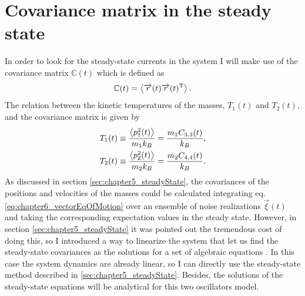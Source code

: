\section{Covariance matrix in the steady state\label{sec:covMatrix}}
%
%
%
%
%
%
In order to look for the steady-state currents in the system I will make use of the covariance matrix $\mathbb{C}(t)$ which is defined as
%
\begin{equation}
\mathbb{C}(t) = \expval{\overrightarrow{r}(t)\overrightarrow{r}(t)^\mathsf{T}}.
\end{equation}
%
The relation between the kinetic temperatures of the masses, $T_1(t)$ and  $T_2(t)$, and the covariance matrix is given by
%
\begin{align}
  T_1(t) &\equiv \frac{\expval{ p_1^2(t)}}{m_1 k_B} = \frac{m_1 C_{3,3}(t)}{k_B},
  \nonumber\\
   T_2(t) &\equiv \frac{\expval{ p_2^2(t)}}{m_2 k_B} = \frac{m_2 C_{4,4}(t)}{k_B}.
  \label{eq:chapter6_Temperature_definition}
\end{align}
%
As discussed in section \ref{sec:chapter5_steadyState}, the covariances of the positions and velocities of the masses could be calculated integrating eq. \eqref{eq:chapter6_vectorEqOfMotion} over an ensemble of noise realizations $\overrightarrow{\xi}(t)$ and taking the corresponding expectation values in the steady state. However, in section \ref{sec:chapter5_steadyState} it was pointed out the tremendous cost of doing this, so I introduced a way to linearize the system that let us find the steady-state covariances as the solutions for a set of algebraic equations \cite{Sarkka2019,Rieder1967,Casher1971}. In this case the system dynamics are already linear, so I can directly use the steady-state method described in \ref{sec:chapter5_steadyState}. Besides, the solutions of the steady-state equations will be analytical for this two oscillators model.

